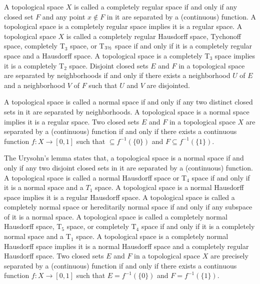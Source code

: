 \documentclass[a4paper,12pt]{article}
\begin{document}
A topological space $X$ is called a completely regular space if and only if any closed set $F$ and any point $x\notin F$ in it are separated by a (continuous) function. A topological space is a completely regular space implies it is a regular space.
A topological space $X$ is called a completely regular Hausdorff space, Tychonoff space, completely T$_3$ space, or T\(_{3\text{\textonehalf}}\) space if and only if it is a completely regular space and a Hausdorff space. A topological space is a completely T$_3$ space implies it is a completely T$_2$ space.
Disjoint closed sets $E$ and $F$ in a topological space are separated by neighborhoods if and only if there exists a neighborhood $U$ of $E$ and a neighborhood $V$ of $F$ such that $U$ and $V$ are disjointed.

A topological space is called a normal space if and only if any two distinct closed sets in it are separated by neighborhoods. A topological space is a normal space implies it is a regular space.
Two closed sets $E$ and $F$ in a topological space $X$ are separated by a (continuous) function if and only if there exists a continuous function $f\colon X\to [0,1]$ such that $\subseteq f^{-1}(\{0\})$ and $F\subseteq f^{-1}(\{1\})$.

The Urysohn's lemma states that, a topological space is a normal space if and only if any two disjoint closed sets in it are separated by a (continuous) function.
A topological space is called a normal Hausdorff space or T$_4$ space if and only if it is a normal space and a $T_1$ space. A topological space is a normal Hausdorff space implies it is a regular Hausdorff space.
A topological space is called a completely normal space or hereditarily normal space if and only if any subspace of it is a normal space.
A topological space is called a completely normal Hausdorff space, T$_5$ space, or completely T$_4$ space if and only if it is a completely normal space and a T$_1$ space. A topological space is a completely normal Hausdorff space implies it is a normal Hausdorff space and a completely regular Hausdorff space.
Two closed sets $E$ and $F$ in a topological space $X$ are precisely separated by a (continuous) function if and only if there exists a continuous function $f\colon X\to [0,1]$ such that $E=f^{-1}(\{0\})$ and $F=f^{-1}(\{1\})$.
\end{document}
